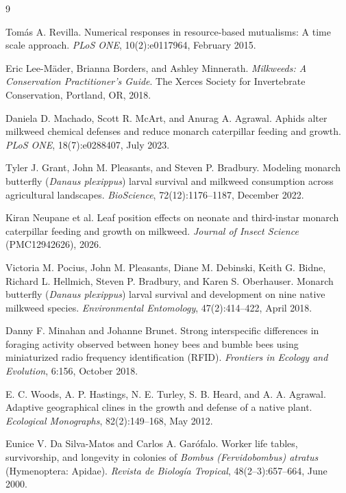 \documentclass[11pt]{article}
\begin{document}
\FloatBarrier
\begin{thebibliography}{9}

Tom\'as A. Revilla.
\newblock Numerical responses in resource-based mutualisms: A time scale approach.
\newblock \textit{PLoS ONE}, 10(2):e0117964, February 2015.

Eric Lee-M\"ader, Brianna Borders, and Ashley Minnerath.
\newblock \textit{Milkweeds: A Conservation Practitioner's Guide}.
\newblock The Xerces Society for Invertebrate Conservation, Portland, OR, 2018.

Daniela D. Machado, Scott R. McArt, and Anurag A. Agrawal.
\newblock Aphids alter milkweed chemical defenses and reduce monarch caterpillar feeding and growth.
\newblock \textit{PLoS ONE}, 18(7):e0288407, July 2023.

Tyler J. Grant, John M. Pleasants, and Steven P. Bradbury.
\newblock Modeling monarch butterfly (\textit{Danaus plexippus}) larval survival and milkweed consumption across agricultural landscapes.
\newblock \textit{BioScience}, 72(12):1176--1187, December 2022.

Kiran Neupane et al.
\newblock Leaf position effects on neonate and third-instar monarch caterpillar feeding and growth on milkweed.
\newblock \textit{Journal of Insect Science} (PMC12942626), 2026.

Victoria M. Pocius, John M. Pleasants, Diane M. Debinski, Keith G. Bidne, Richard L. Hellmich, Steven P. Bradbury, and Karen S. Oberhauser.
\newblock Monarch butterfly (\textit{Danaus plexippus}) larval survival and development on nine native milkweed species.
\newblock \textit{Environmental Entomology}, 47(2):414--422, April 2018.

Danny F. Minahan and Johanne Brunet.
\newblock Strong interspecific differences in foraging activity observed between honey bees and bumble bees using miniaturized radio frequency identification (RFID).
\newblock \textit{Frontiers in Ecology and Evolution}, 6:156, October 2018.

E. C. Woods, A. P. Hastings, N. E. Turley, S. B. Heard, and A. A. Agrawal.
\newblock Adaptive geographical clines in the growth and defense of a native plant.
\newblock \textit{Ecological Monographs}, 82(2):149--168, May 2012.

Eunice V. Da Silva-Matos and Carlos A. Gar\'ofalo.
\newblock Worker life tables, survivorship, and longevity in colonies of \textit{Bombus (Fervidobombus) atratus} (Hymenoptera: Apidae).
\newblock \textit{Revista de Biolog\'ia Tropical}, 48(2--3):657--664, June 2000.

\end{thebibliography}
\end{document}

